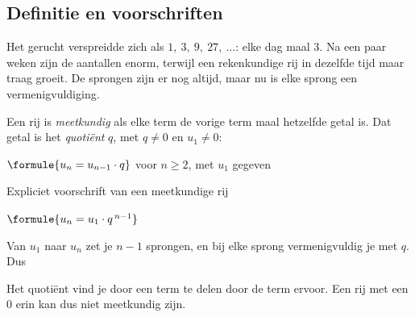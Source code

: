\subsection{Definitie en voorschriften}

Het gerucht verspreidde zich als $1,\ 3,\ 9,\ 27,\ \ldots$: elke dag maal 3. Na een paar weken zijn de aantallen enorm, terwijl een rekenkundige rij in dezelfde tijd maar traag groeit. De sprongen zijn er nog altijd, maar nu is elke sprong een vermenigvuldiging.

\begin{theorie}
Een rij is \emph{meetkundig} als elke term de vorige term maal hetzelfde getal is. Dat getal is het \emph{quotiënt} $q$, met $q \neq 0$ en $u_1 \neq 0$:

\qquad $\formule{u_n = u_{n-1} \cdot q}$ \quad voor $n \geqslant 2$, met $u_1$ gegeven

\begin{stelling}{Expliciet voorschrift van een meetkundige rij}
\begin{minipage}[t]{.4\linewidth}
\vspace{0pt}
\qquad $\formule{u_n = u_1 \cdot q^{\,n-1}}$
\end{minipage}\hfill
\begin{minipage}[t]{.56\linewidth}
\vspace{0pt}
\end{minipage}
\end{stelling}

\begin{bewijs}
Van $u_1$ naar $u_n$ zet je $n - 1$ sprongen, en bij elke sprong vermenigvuldig je met $q$. Dus
\end{bewijs}
\end{theorie}

Het quotiënt vind je door een term te delen door de term ervoor. Een rij met een 0 erin kan dus niet meetkundig zijn.


